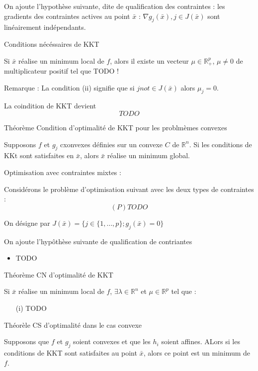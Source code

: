 On ajoute l'hypothèse suivante, dite de qualification des contraintes : les gradients des contraintes actives au point $\bar{x}$ : $\nabla g_j(\bar{x}), {j\in J(\bar{x})}$ sont linéairement indépendants.

	Conditions nécéssaires de KKT
	
	Si $\bar{x}$ réalise un minimum local de $f$, alors il existe un vecteur $\mu \in \mathbb{R}_+^p$, $\mu \ne 0$ de multiplicateur positif tel que TODO !
	

Remarque : La condition (ii) signifie que si $j not \in J(\bar{x})$ alors $\mu_j = 0$.

La coindition de KKT devient \[ TODO \]

Théorème Condition d'optimalité de KKT pour les problmèmes convexes

Supposons $f$ et $g_j$ cxonvexes définies sur un convexe $C$ de $\mathbb{R}^n$. Si les conditions de KKt sont satisfaites en $\bar{x}$, alors $\bar{x}$ réalise un minimum global.

Optimisation avec contraintes mixtes :

Considérons le problème d'optimisation suivant avec les deux types de contraintes : \[ (P) TODO \]

On désigne par $J(\bar{x})=\{j \in \{1, \dots , p\}; g_j(\bar{x}) = 0\}$

On ajoute l'hypôthèse suivante de qualification de contriantes

\begin{itemize}
	\item TODO
\end{itemize}

Théorème CN d'optimalité de KKT

Si $\bar{x}$ réalise un minimum local de $f$, $\exists \lambda \in \mathbb{R}^n$ et $\mu \in \mathbb{R}^p$ tel que :
\begin{itemize}
	\item[(i)] TODO
\end{itemize}

Théorèle CS d'optimalité dans le cas convexe

Supposons que $f$ et $g_j$ soient convexes et que les $h_i$ soient affines. ALors si les conditions de KKT sont satisfaites au point $\bar{x}$, alors ce point est un minimum de $f$.

